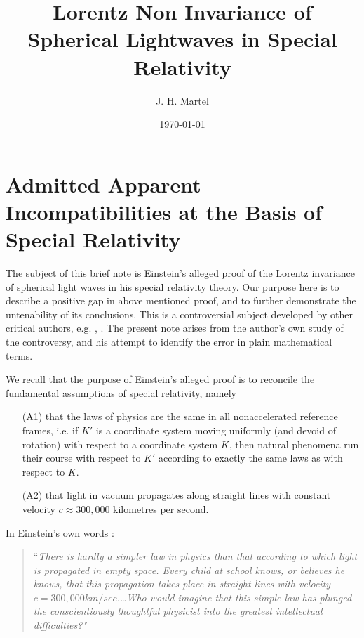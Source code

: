 \documentclass[12pt]{amsart}
\theoremstyle{definition}
\theoremstyle{remark}
\begin{document}
\title{Lorentz Non Invariance of Spherical Lightwaves in Special Relativity}


\author{J. H. Martel}
\date{\today}
\maketitle

\tableofcontents

\section{Admitted Apparent Incompatibilities at the Basis of Special Relativity}
The subject of this brief note is Einstein's alleged proof of the Lorentz invariance of spherical light waves in his special relativity theory. Our purpose here is to describe a positive gap in above mentioned proof, and to further demonstrate the untenability of its conclusions. This is a controversial subject developed by other critical authors, e.g. \cite{bryant}, \cite{crothers}. The present note arises from the author's own study of the controversy, and his attempt to identify the error in plain mathematical terms. 


We recall that the purpose of Einstein's alleged proof \cite{einstein2019relativity} is to reconcile the fundamental assumptions of special relativity, namely
\begin{itemize}

\item[(A1)] that the laws of physics are the same in all nonaccelerated reference frames, i.e. if $K'$ is a coordinate system moving uniformly (and devoid of rotation) with respect to a coordinate system $K$, then natural phenomena run their course with respect to $K'$ according to exactly the same laws as with respect to $K$. 

\item[(A2)] that light in vacuum propagates along straight lines with constant velocity $c\approx 300,000$ kilometres per second.

\end{itemize}

In Einstein's own words \cite[Ch.7, 11]{einstein2019relativity}:

\begin{quote} 
``\emph{There is hardly a simpler law in physics than that according to which light is propagated in empty space. Every child at school knows, or believes he knows, that this propagation takes place in straight lines with velocity $c=300, 000 km/sec$.\ldots Who would imagine that this simple law has plunged the conscientiously thoughtful physicist into the greatest intellectual difficulties?"} 
\end{quote}
\end{document}
